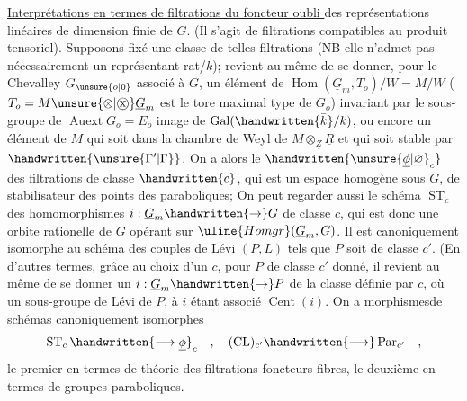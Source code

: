 \uline{Interprétations en termes de filtrations du foncteur oubli } des représentations linéaires de dimension finie de $G$. (Il s'agit de filtrations compatibles au produit tensoriel). Supposons fixé une classe de telles filtrations (NB elle n'admet pas nécessairement un représentant rat/$k$);  revient au même de se donner, pour le Chevalley $G_{\unsure{o|0}}$ associé à $G$, un  élément de $\operatorname{Hom}(\underline{G}_m,T_o)/W=M/W$ ($T_o=M\unsure{\otimes|\mathbin{\text{\textcircled{x}}}}\underline{G}_m$ est le tore maximal type de $G_o$) invariant par le sous-groupe\inserted{\handwritten{$\Gamma$}} de $\operatorname{Auext}G_o=E_o$ image de $\operatorname{Gal}(\handwritten{\bar{k}}/k)$, ou encore un  élément de $M$ qui soit dans la chambre de Weyl de $M\otimes_{\underline{Z}}\underline{R}$ et qui soit stable par $\handwritten{\unsure{\Gamma'|\Gamma}}$. On a alors le  $\handwritten{\unsure{\underline{\phi}|\underline{\varnothing}}_c}$ des filtrations de classe $\handwritten{c}$, qui est un espace homogène sous $G$, de stabilisateur des points des paraboliques; On peut regarder aussi le schéma $\operatorname{ST}_c$ des homomorphismes $i:\underline{G}_m\handwritten{\to}G$ de classe $c$, qui est donc une orbite rationelle de $G$ opérant sur $\uline{Homgr}(\underline{G}_m,G)$. Il est canoniquement isomorphe au schéma des couples de Lévi $(P,L)$ tels que $P$ soit de classe $c'$. (En d'autres termes, grâce au choix d'un $c$, pour $P$ de classe $c'$ donné, il revient au même de se donner un $i:\underline{G}_m\handwritten{\to}P$ de la classe définie par $c$, où un sous-groupe de Lévi de $P$, à $i$ étant associé $\operatorname{Cent}(i)$.\handwritten{)} On a morphismesde schémas canoniquement isomorphes
\[
\operatorname{ST}_c\handwritten{\longrightarrow\underline{\phi}}_c\quad,\quad
(\operatorname{CL})_{c'}\handwritten{\longrightarrow}\operatorname{Par}_{c'}\quad,
\]
le premier en termes de théorie des filtrations  foncteurs fibres, le deuxième en termes de groupes paraboliques.

